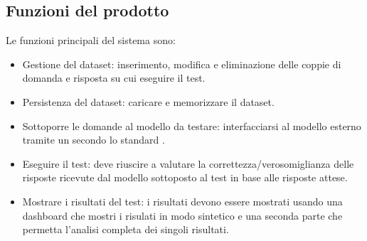 
\subsection{Funzioni del prodotto}
Le funzioni principali del sistema sono:
\begin{itemize}
    \item Gestione del dataset: inserimento, modifica e eliminazione delle coppie di domanda e risposta su cui eseguire il test.
    \item Persistenza del dataset: caricare e memorizzare il dataset.
    \item Sottoporre le domande al modello da testare: interfacciarsi al modello esterno tramite un  secondo lo standard .
    \item Eseguire il test: deve riuscire a valutare la correttezza/verosomiglianza delle risposte ricevute dal modello sottoposto al test in base alle risposte attese.
    \item Mostrare i risultati del test: i risultati devono essere mostrati usando una dashboard che mostri i risulati in modo sintetico e una seconda parte che permetta l'analisi completa dei singoli risultati.
\end{itemize}